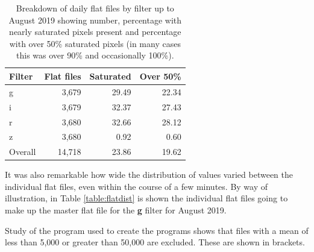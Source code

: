 \begin{table}[!htbp]
\begin{center}
\begin{tabular}{lrrr} \hline
Filter & Flat files & Saturated & Over 50\%\\\hline
g & 3,679 & 29.49 & 22.34 \\
i & 3,679 & 32.37 & 27.43 \\
r & 3,680 & 32.66 & 28.12 \\
z & 3,680 & 0.92 & 0.60 \\\hline
Overall & 14,718 & 23.86 & 19.62\\
\hline
\end{tabular}
\end{center}
\caption{Breakdown of daily flat files by filter up to August 2019 showing
number, percentage with nearly saturated pixels present and percentage with over
50\% saturated pixels (in many cases this was over 90\% and occasionally 100\%).}
\protect\label{table:satpix}
\end{table}

It was also remarkable how wide the distribution of values varied between the
individual flat files, even within the course of a few minutes. By way of
illustration, in Table \ref{table:flatdist} is shown the individual flat files
going to make up the master flat file for the \textbf{g} filter for August 2019.

Study of the program used to create the programs shows that files with a mean of
less than 5,000 or greater than 50,000 are excluded. These are shown in
brackets.

